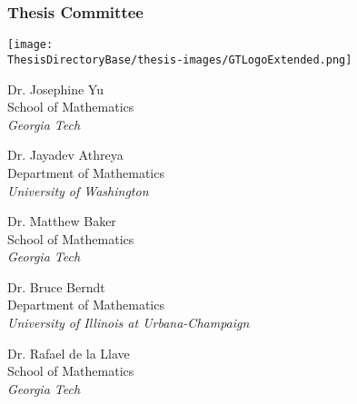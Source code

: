 \begin{frame}
\titlepage %
\end{frame} 

\begin{frame}[fragile]
\frametitle{Thesis Committee}

       \vspace*{-0.4cm}
       \begin{FlushLeft}
       \texttt{[image: \\ThesisDirectoryBase/thesis-images/GTLogoExtended.png]}
       \end{FlushLeft}
       \vspace*{0.15cm}
       \begin{minipage}{0.13\textwidth}
       
       \end{minipage}\hfil
       \begin{minipage}{0.31\textwidth}
       \small Dr. Josephine Yu \\ 
       \small School of Mathematics \\ 
       \small \textit{Georgia Tech}
       \end{minipage}\hfil
       \begin{minipage}{0.56\textwidth}
       \small Dr. Jayadev Athreya \\ 
       \small Department of Mathematics \\ 
       \small \textit{University of Washington}
       \end{minipage}
       \TitlePageSmallSkip
       \begin{minipage}{0.13\textwidth}
       
       \end{minipage}\hfil
       \begin{minipage}{0.31\textwidth}
       \small Dr. Matthew Baker \\ 
       \small School of Mathematics \\ 
       \small \textit{Georgia Tech}
       \end{minipage}\hfil
       \begin{minipage}{0.56\textwidth}
       \small Dr. Bruce Berndt \\ 
       \small Department of Mathematics \\ 
       \small \textit{University of Illinois at Urbana-Champaign}
       \end{minipage}
       \TitlePageSmallSkip
       \begin{minipage}{0.13\textwidth}
       
       \end{minipage}\hfil
       \begin{minipage}{0.9\textwidth}
       \small Dr. Rafael de la Llave \\ 
       \small School of Mathematics \\ 
       \small \textit{Georgia Tech}
       \end{minipage}\hfil

\end{frame}
